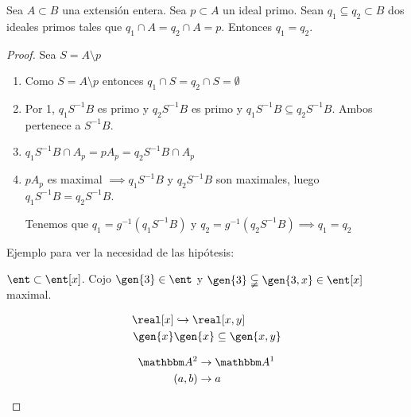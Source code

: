 \begin{prop} \label{prop:ExtensionPrimosUnico}
	Sea $A \subset B$ una extensión entera. Sea $p \subset A$ un ideal primo. Sean $q_1 \subseteq q_2 \subset B$ dos ideales primos tales que $q_1 \cap A=q_2 \cap A = p$. Entonces $q_1=q_2$.
\end{prop}

\begin{proof}
	Sea $S = A \setminus p$


	\begin{enumerate}
		\item 	Como $S= A \setminus p$ entonces $q_1 \cap S = q_2 \cap S = \emptyset$
		\item Por 1, $q_1S^{-1}B$ es primo y $q_2S^{-1}B$ es primo y $q_1S^{-1}B  \subseteq q_2S^{-1}B$. Ambos pertenece a $S^{-1}B$.

		\item $q_1S^{-1}B \cap A_p=pA_p=q_2S^{-1}B \cap A_p$
		\item $pA_p$ es maximal $\implies q_1S^{-1}B$ y $q_2S^{-1}B$ son maximales, luego $q_1S^{-1}B = q_2S^{-1}B$.

		Tenemos que $q_1=g^{-1}(q_1S^{-1}B)$ y $q_2=g^{-1}(q_2S^{-1}B) \implies q_1 = q_2$
	\end{enumerate}

	Ejemplo para ver la necesidad de las hipótesis:

	\begin{example}
		$\ent \subset \ent[x]$. Cojo $\gen{3} \in \ent$ y $\gen{3} \subsetneqq \gen{3,x} \in \ent[x]$ maximal.
	\end{example}

	\begin{example}
		\begin{align*}
			\real[x] & \hookrightarrow \real[x,y] \\
			\gen{x} & \gen{x} \subseteq \gen{x,y}
		\end{align*}

		\begin{align*}
			\A^2 & \rightarrow \A^1 \\
			(a,b)& \rightarrow a
		\end{align*}

	\end{example}

\end{proof}

